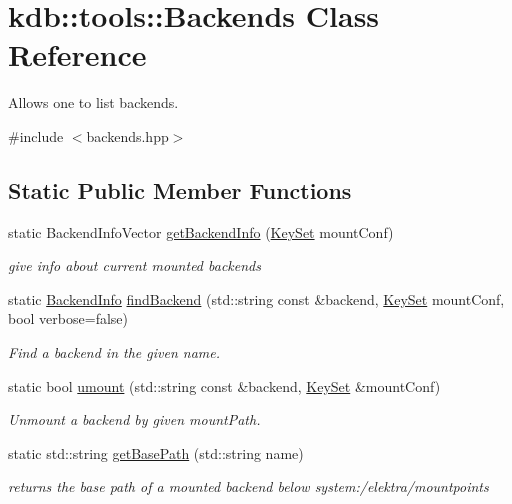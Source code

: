 \hypertarget{classkdb_1_1tools_1_1Backends}{}\section{kdb\+:\+:tools\+:\+:Backends Class Reference}
\label{classkdb_1_1tools_1_1Backends}


Allows one to list backends.  




{\ttfamily \#include $<$backends.\+hpp$>$}

\subsection*{Static Public Member Functions}
\begin{DoxyCompactItemize}
\item 
static Backend\+Info\+Vector \hyperlink{classkdb_1_1tools_1_1Backends_a82b334d8a1e01df664462c6dd43bd7e1}{get\+Backend\+Info} (\hyperlink{classkdb_1_1KeySet}{Key\+Set} mount\+Conf)
\begin{DoxyCompactList}\small\item\em give info about current mounted backends \end{DoxyCompactList}\item 
static \hyperlink{structkdb_1_1tools_1_1BackendInfo}{Backend\+Info} \hyperlink{classkdb_1_1tools_1_1Backends_a692f3f6b5f01ed2e497a6e093e1e2e90}{find\+Backend} (std\+::string const \&backend, \hyperlink{classkdb_1_1KeySet}{Key\+Set} mount\+Conf, bool verbose=false)
\begin{DoxyCompactList}\small\item\em Find a backend in the given name. \end{DoxyCompactList}\item 
static bool \hyperlink{classkdb_1_1tools_1_1Backends_aca36f903059e3df0f2ded569d6d8df8c}{umount} (std\+::string const \&backend, \hyperlink{classkdb_1_1KeySet}{Key\+Set} \&mount\+Conf)
\begin{DoxyCompactList}\small\item\em Unmount a backend by given mount\+Path. \end{DoxyCompactList}\item 
static std\+::string \hyperlink{classkdb_1_1tools_1_1Backends_a76af9122c56426f4d0119e44719c7309}{get\+Base\+Path} (std\+::string name)
\begin{DoxyCompactList}\small\item\em returns the base path of a mounted backend below system\+:/elektra/mountpoints \end{DoxyCompactList}\end{DoxyCompactItemize}
